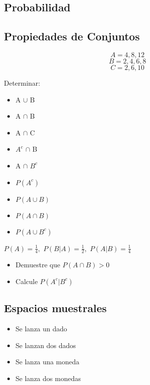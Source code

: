 \documentclass{../oxmathproblems}
\begin{document}
\begin{questions}
\section{Probabilidad} 

\subsection{Propiedades de Conjuntos}

\miquestion 
$$ A = {4,8,12}$$
$$ B = {2,4,6,8}$$
$$ C = {2,6,10}$$

Determinar: 
\begin{itemize}
\item A $\cup$ B
\item A $\cap$ B
\item A $\cap$ C
\item $A^c$ $\cap$ B
\item A $\cap$ $B^c$
\end{itemize}


\begin{itemize}
\item $P(A^c)$
\item $P(A\cup B)$
\item $P(A\cap B)$
\item $P(A\cup B^c)$
\end{itemize}

$P(A)=\frac{1}{4},$ 
$P(B|A) = \frac{1}{2},$
$P(A|B) = \frac{1}{4}$ 

\begin{itemize}
\item Demuestre que $P(A\cap B) > 0$
\item Calcule $P(A^c|B^c)$
\end{itemize}



\subsection{Espacios muestrales}


\begin{itemize}
\item Se lanza un dado 
\item Se lanzan dos dados
\item Se lanza una moneda
\item Se lanza dos monedas
\end{itemize}



\end{questions}
\end{document}

